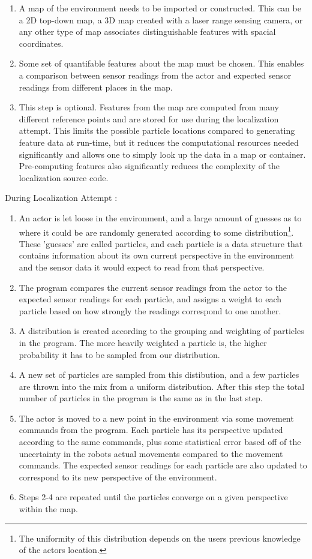 \documentclass[a4paper,11pt]{article}
\begin{document}
  \begin{enumerate}
  \item A map of the environment needs to be imported or constructed. This can be a 2D top-down map, a 3D map created with a 
  laser range sensing camera, or any other type of map associates distinguishable features with spacial coordinates.
  \item Some set of quantifable features about the map must be chosen. This enables a comparison between sensor readings from the actor and expected sensor readings from different places in the map.
  \item This step is optional.  Features from the map are computed from many different reference points and are stored for use during the localization attempt. This limits the possible particle locations compared to generating feature data at run-time, but it reduces the computational resources needed significantly and allows one to simply look up the data in a map or container. Pre-computing features also significantly reduces the complexity of the localization source code.
  \end{enumerate}
  
  During Localization Attempt :
  
  \begin{enumerate}
  \item An actor is let loose in the environment, and a large amount of guesses as to where it could be are randomly generated according to some distribution\footnote{The uniformity of this distribution depends on the users previous knowledge of the actors location.}. These 'guesses' are called particles, and each particle is a data structure that contains information about its own current perspective in the environment and the sensor data it would expect to read from that perspective.
  \item The program compares the current sensor readings from the actor to the expected sensor readings for each particle, and assigns a weight to each particle based on how strongly the readings correspond to one another.
  \item A distribution is created according to the grouping and weighting of particles in the program. The more heavily weighted a particle is, the higher probability it has to be sampled from our distribution.
  \item A new set of particles are sampled from this distibution, and a few particles are thrown into the mix from a uniform distribution. After this step the total number of particles in the program is the same as in the last step.
  \item The actor is moved to a new point in the environment via some movement commands from the program. Each particle has its perspective updated according to the same commands, plus some statistical error based off of the uncertainty in the robots actual movements compared to the movement commands. The expected sensor readings for each particle are also updated to correspond to its new perspective of the environment.
  \item Steps 2-4 are repeated until the particles converge on a given perspective within the map. 
  \end{enumerate} 
  
\end{document}

